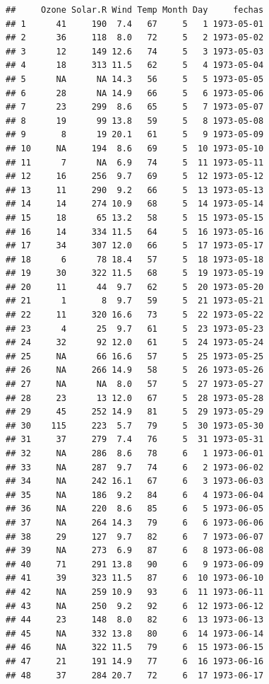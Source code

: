\documentclass[11pt,]{book}
\begin{document}
\begin{verbatim}
##     Ozone Solar.R Wind Temp Month Day     fechas
## 1      41     190  7.4   67     5   1 1973-05-01
## 2      36     118  8.0   72     5   2 1973-05-02
## 3      12     149 12.6   74     5   3 1973-05-03
## 4      18     313 11.5   62     5   4 1973-05-04
## 5      NA      NA 14.3   56     5   5 1973-05-05
## 6      28      NA 14.9   66     5   6 1973-05-06
## 7      23     299  8.6   65     5   7 1973-05-07
## 8      19      99 13.8   59     5   8 1973-05-08
## 9       8      19 20.1   61     5   9 1973-05-09
## 10     NA     194  8.6   69     5  10 1973-05-10
## 11      7      NA  6.9   74     5  11 1973-05-11
## 12     16     256  9.7   69     5  12 1973-05-12
## 13     11     290  9.2   66     5  13 1973-05-13
## 14     14     274 10.9   68     5  14 1973-05-14
## 15     18      65 13.2   58     5  15 1973-05-15
## 16     14     334 11.5   64     5  16 1973-05-16
## 17     34     307 12.0   66     5  17 1973-05-17
## 18      6      78 18.4   57     5  18 1973-05-18
## 19     30     322 11.5   68     5  19 1973-05-19
## 20     11      44  9.7   62     5  20 1973-05-20
## 21      1       8  9.7   59     5  21 1973-05-21
## 22     11     320 16.6   73     5  22 1973-05-22
## 23      4      25  9.7   61     5  23 1973-05-23
## 24     32      92 12.0   61     5  24 1973-05-24
## 25     NA      66 16.6   57     5  25 1973-05-25
## 26     NA     266 14.9   58     5  26 1973-05-26
## 27     NA      NA  8.0   57     5  27 1973-05-27
## 28     23      13 12.0   67     5  28 1973-05-28
## 29     45     252 14.9   81     5  29 1973-05-29
## 30    115     223  5.7   79     5  30 1973-05-30
## 31     37     279  7.4   76     5  31 1973-05-31
## 32     NA     286  8.6   78     6   1 1973-06-01
## 33     NA     287  9.7   74     6   2 1973-06-02
## 34     NA     242 16.1   67     6   3 1973-06-03
## 35     NA     186  9.2   84     6   4 1973-06-04
## 36     NA     220  8.6   85     6   5 1973-06-05
## 37     NA     264 14.3   79     6   6 1973-06-06
## 38     29     127  9.7   82     6   7 1973-06-07
## 39     NA     273  6.9   87     6   8 1973-06-08
## 40     71     291 13.8   90     6   9 1973-06-09
## 41     39     323 11.5   87     6  10 1973-06-10
## 42     NA     259 10.9   93     6  11 1973-06-11
## 43     NA     250  9.2   92     6  12 1973-06-12
## 44     23     148  8.0   82     6  13 1973-06-13
## 45     NA     332 13.8   80     6  14 1973-06-14
## 46     NA     322 11.5   79     6  15 1973-06-15
## 47     21     191 14.9   77     6  16 1973-06-16
## 48     37     284 20.7   72     6  17 1973-06-17

\end{verbatim}
\end{document}
